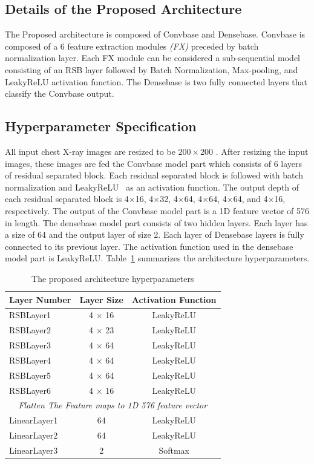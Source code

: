 \subsection{Details of the Proposed Architecture}
The Proposed architecture is composed of Convbase and Densebase. Convbase is composed of a $6$ feature extraction modules \textit{(FX)} preceded by batch normalization layer. Each FX module can be considered a sub-sequential model consisting of an RSB layer followed by Batch Normalization, Max-pooling, and LeakyReLU activation function. The Densebase is two fully connected layers that classify the Convbase output.


\subsection{Hyperparameter Specification}
All input chest X-ray images are resized to be $200\times 200$ . After resizing the input images, these images are fed the Convbase model part which consists of 6 layers of residual separated block. Each residual separated block is followed with batch normalization and LeakyReLU~\cite{he2015delving} as an activation function. The output depth of each residual separated block is 4$\times$16, 4$\times$32, 4$\times$64, 4$\times$64, 4$\times$64, and 4$\times$16, respectively. The output of the Convbase model part is a 1D feature vector of 576 in length. The densebase model part consists of two hidden layers. Each layer has a size of 64 and the output layer of size 2. Each layer of Densebase layers is fully connected to its previous layer. The activation function used in the densebase model part is LeakyReLU. Table~\ref{lyrSpec} summarizes the architecture hyperparameters.

\begin{table}[htbp]
\caption{The proposed architecture hyperparameters}
\begin{center}

\begin{tabular}{|l|c|c|}
\hline
\textbf{Layer Number} & \textbf{Layer Size} & \textbf{Activation Function} \\
\hline
\hline
RSBLayer1 & 4 $\times$ 16 & LeakyReLU\\
\hline
RSBLayer2 & 4 $\times$ 23 & LeakyReLU\\
\hline
RSBLayer3 & 4 $\times$ 64 & LeakyReLU\\
\hline
RSBLayer4 & 4 $\times$ 64 & LeakyReLU\\
\hline
RSBLayer5 & 4 $\times$ 64 & LeakyReLU\\
\hline
RSBLayer6 & 4 $\times$ 16 & LeakyReLU\\
\hline
\multicolumn{3}{|c|}{\textit{Flatten The Feature maps to 1D 576 feature  vector}}\\
\cline{1-3}
LinearLayer1 & 64 & LeakyReLU\\
\hline
LinearLayer2 & 64 & LeakyReLU\\
\hline
LinearLayer3 & 2 & Softmax\\
\hline
\end{tabular}
\label{lyrSpec}
\end{center}
\end{table}

